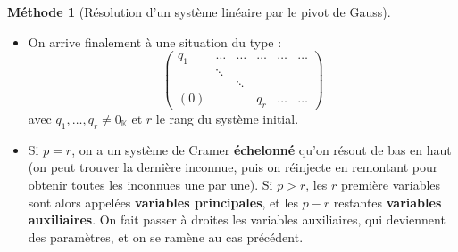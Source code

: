\documentclass[french]{book}
\newcommand{\K}{\mathbb{K}}
\theoremstyle{plain}
\theoremstyle{definition}
\newtheorem{met}{Méthode}[chapter]
\theoremstyle{remark}
\begin{document}
\begin{met}[Résolution d'un système linéaire par le pivot de Gauss]
\begin{itemize}
		\begin{itemize}
			\item[--] Si le second membre correspondant n'est pas nul, alors on a une contradiction, et il n'y a pas de solution.
			\item[--] Sinon, on est face à des lignes du type "$0=0"$, et il est équivalent de les supprimer.
		\end{itemize}
		\item On arrive finalement à une situation du type : $$\begin{pmatrix}
			q_1&\ldots&\ldots&\ldots&\ldots&\ldots\\&\ddots&&&&\\&&\ddots&&&\\ (0)&&&q_r&\ldots&\ldots
		\end{pmatrix}$$ avec $q_1,\ldots,q_r\ne0_\K$ et $r$ le rang du système initial.
		\item Si $p=r$, on a un système de Cramer \textbf{échelonné} qu'on résout de bas en haut (on peut trouver la dernière inconnue, puis on réinjecte en remontant pour obtenir toutes les inconnues une par une). Si $p>r$, les $r$ première variables sont alors appelées \textbf{variables principales}, et les $p-r$ restantes \textbf{variables auxiliaires}. On fait passer à droites les variables auxiliaires, qui deviennent des paramètres, et on se ramène au cas précédent.
	\end{itemize}
\end{met}
\end{document}
